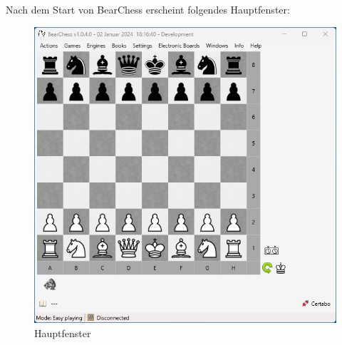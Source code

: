 \documentclass[11pt,a4paper]{article}
\begin{document}
	Nach dem Start von BearChess erscheint folgendes Hauptfenster:
	\begin{figure}[H]
		\centering
		\includegraphics[scale=0.7]{BearChess_MainWindow.png}
		\caption{Hauptfenster}
		\label{fig:MainWindow}
	\end{figure}
	
\end{document}
